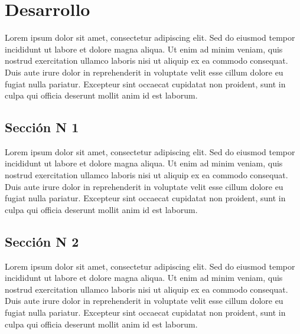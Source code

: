 \newpage
\section{Desarrollo}
    Lorem ipsum dolor sit amet, consectetur adipiscing elit. Sed do eiusmod tempor incididunt ut labore et dolore magna aliqua. Ut enim ad minim veniam, quis nostrud exercitation ullamco laboris nisi ut aliquip ex ea commodo consequat. Duis aute irure dolor in reprehenderit in voluptate velit esse cillum dolore eu fugiat nulla pariatur. Excepteur sint occaecat cupidatat non proident, sunt in culpa qui officia deserunt mollit anim id est laborum.

    \subsection{Sección N 1}
        Lorem ipsum dolor sit amet, consectetur adipiscing elit. Sed do eiusmod tempor incididunt ut labore et dolore magna aliqua. Ut enim ad minim veniam, quis nostrud exercitation ullamco laboris nisi ut aliquip ex ea commodo consequat. Duis aute irure dolor in reprehenderit in voluptate velit esse cillum dolore eu fugiat nulla pariatur. Excepteur sint occaecat cupidatat non proident, sunt in culpa qui officia deserunt mollit anim id est laborum.

    \newpage
    \subsection{Sección N 2}
        Lorem ipsum dolor sit amet, consectetur adipiscing elit. Sed do eiusmod tempor incididunt ut labore et dolore magna aliqua. Ut enim ad minim veniam, quis nostrud exercitation ullamco laboris nisi ut aliquip ex ea commodo consequat. Duis aute irure dolor in reprehenderit in voluptate velit esse cillum dolore eu fugiat nulla pariatur. Excepteur sint occaecat cupidatat non proident, sunt in culpa qui officia deserunt mollit anim id est laborum.